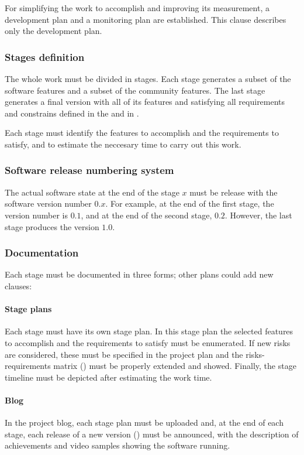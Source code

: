 \documentclass[twocolumn]{article}
\begin{document}
For simplifying the work to accomplish and improving its measurement,
a development plan and a monitoring plan are established. This clause
describes only the development plan.

\subsubsection{Stages definition}
The whole work must be divided in stages. Each stage generates a
subset of the \fav software features and a subset of the \fav
community features. The last stage generates a final version with all
of its features and satisfying all requirements and constrains defined
in the \favc and in .

Each stage must identify the features to accomplish and the
requirements to satisfy, and to estimate the neccesary time to carry
out this work.

\subsubsection{Software release numbering system}
\label{sssec:release}
The actual software state at the end of the stage $x$ must be release
with the software version number $0.x$. For example, at the end of the first
stage, the version number is $0.1$, and at the end of the second
stage, $0.2$. However, the last stage produces the \fav version
$1.0$.

\subsubsection{Documentation}
Each stage must be documented in three forms; other plans could add new
clauses:

\paragraph{Stage plans}
Each stage must have its own stage plan. In this stage plan the
selected features to accomplish and the requirements to satisfy must
be enumerated. If new risks are considered, these must be specified in
the project plan and the risks-requirements matrix
() must be properly extended and
showed. Finally, the stage timeline must be depicted after estimating
the work time.

\paragraph{Blog}
In the project blog, each stage plan must be uploaded and, at the end
of each stage, each release of a new version ()
must be announced, with the description of achievements and video
samples showing the software running.
\end{document}
